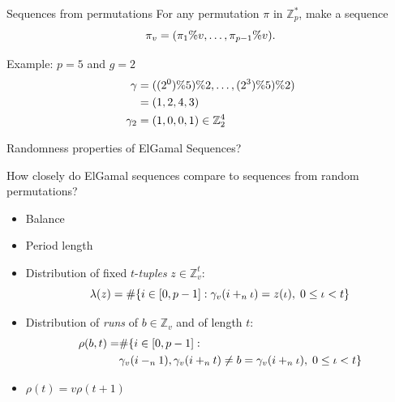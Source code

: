 \begin{frame}{Sequences from permutations}
    For any  permutation $\pi$ in $\mathbb{Z}_p^*$, make a sequence
    \[
        \pi_v = (\pi_1 \% v, \ldots, \pi_{p-1}\% v).
    \]
    
    \pause

    Example:  $p=5$ and $g=2$
    \begin{align*}            \gamma &= ( (2^0) \% 5) \% 2, \ldots, (2^3) \% 5) \% 2)\\
      &= (1, 2, 4, 3) \\
        \gamma_2 &= (1, 0, 0, 1) \in \mathbb{Z}_2^4
    \end{align*}
\end{frame}


\begin{frame}{Randomness properties of ElGamal Sequences?}
    
    \begin{center}
        How closely do ElGamal sequences compare to sequences from random permutations?
    \end{center}
    
    \begin{itemize}
        \item Balance
        \item Period length
        \item Distribution of fixed $t$-\emph{tuples} $z\in\mathbb{Z}_v^t$:
        $$\lambda(z) = \#{\{i \in [0,p-1]: \gamma_v(i+_{n} \iota) = z(\iota),\; 0 \leq \iota < t\}}$$
        \item  Distribution of \emph{runs} of $b\in\mathbb{Z}_v$ and of length $t$:
        \begin{align*}
            \rho(b,t) = & \#{ \{i \in [0,p-1]: }\\
                        &\gamma_v(i-_{n} 1),\gamma_v(i+_n t) \neq b = \gamma_v(i+_n\iota),\; 0 \leq \iota < t\}
        \end{align*}
        \item $\rho(t) = v \rho(t+1)$
    \end{itemize}
  
  \end{frame}

